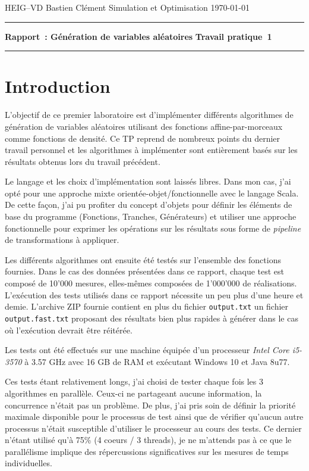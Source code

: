 \documentclass[a4paper,11pt]{article}
\begin{document}
	
{\sc HEIG--VD} \hfill Bastien Clément\newline 
Simulation et Optimisation \hfill \today \newline
\hrule
\vspace{2mm}
{\large \bf Rapport~: Génération de variables aléatoires} \hfill {\large \bf Travail pratique~1}
\vspace{4mm}
\hrule

\tableofcontents

\section{Introduction}

L'objectif de ce premier laboratoire est d'implémenter différents algorithmes de génération de variables aléatoires utilisant des fonctions affine-par-morceaux comme fonctions de densité. Ce TP reprend de nombreux points du dernier travail personnel et les algorithmes à implémenter sont entièrement basés sur les résultats obtenus lors du travail précédent.

Le langage et les choix d'implémentation sont laissés libres. Dans mon cas, j'ai opté pour une approche mixte orientée-objet/fonctionnelle avec le langage Scala. De cette façon, j'ai pu profiter du concept d'objets pour définir les éléments de base du programme (Fonctions, Tranches, Générateurs) et utiliser une approche fonctionnelle pour exprimer les opérations sur les résultats sous forme de \emph{pipeline} de transformations à appliquer.

Les différents algorithmes ont ensuite été testés sur l'ensemble des fonctions fournies. Dans le cas des données présentées dans ce rapport, chaque test est composé de 10'000 mesures, elles-mêmes composées de 1'000'000 de réalisations. L'exécution des tests utilisés dans ce rapport nécessite un peu plus d'une heure et demie. L'archive ZIP fournie contient en plus du fichier \texttt{output.txt} un fichier \texttt{output.fast.txt} proposant des résultats bien plus rapides à générer dans le cas où l'exécution devrait être réitérée.

Les tests ont été effectués sur une machine équipée d'un processeur \emph{Intel Core i5-3570} à 3.57 GHz avec 16 GB de RAM et exécutant Windows 10 et Java 8u77.

Ces tests étant relativement longs, j'ai choisi de tester chaque fois les 3 algorithmes en parallèle. Ceux-ci ne partageant aucune information, la concurrence n'était pas un problème. De plus, j'ai pris soin de définir la priorité maximale disponible pour le processus de test ainsi que de vérifier qu'aucun autre processus n'était susceptible d'utiliser le processeur au cours des tests. Ce dernier n'étant utilisé qu'à 75\% (4 coeurs / 3 threads), je ne m'attends pas à ce que le parallélisme implique des répercussions significatives sur les mesures de temps individuelles.
\end{document}
